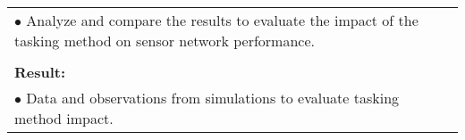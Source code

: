 \begin{table}[!h]
\begin{center}
\begin{tabular}{|p{35mm}||p{55mm}|p{50mm}||p{40mm}|}
      \multicolumn{4}{|p{150mm}|}{$\bullet$ Analyze and compare the results to evaluate the impact of the tasking method on sensor network performance.} \\
      \multicolumn{4}{|p{150mm}|}{}                                                                                                                                                                           \\
      \multicolumn{4}{|p{150mm}|}{\textbf{Result:}}                                                                                                                                                       \\
      \multicolumn{4}{|p{150mm}|}{$\bullet$  Data and observations from simulations to evaluate tasking method impact.}                                                                                                                          \\
      \hline                                                                                                                                                                      
    \end{tabular}
  \end{center}
\end{table}

\clearpage

